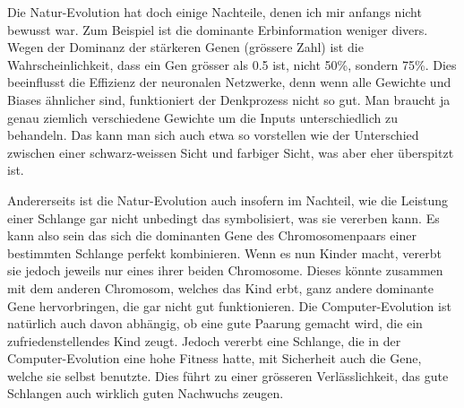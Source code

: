 \documentclass[11pt,a4paper,ngerman]{article}
\begin{document}
\bigskip
Die Natur-Evolution hat doch einige Nachteile, denen ich mir anfangs nicht bewusst war. Zum Beispiel ist die dominante Erbinformation weniger divers. Wegen der Dominanz der stärkeren Genen (grössere Zahl) ist die Wahrscheinlichkeit, dass ein Gen grösser als 0.5 ist, nicht 50\%, sondern 75\%. Dies beeinflusst die Effizienz der neuronalen Netzwerke, denn wenn alle Gewichte und Biases ähnlicher sind, funktioniert der Denkprozess nicht so gut. Man braucht ja genau ziemlich verschiedene Gewichte um die Inputs unterschiedlich zu behandeln. Das kann man sich auch etwa so vorstellen wie der Unterschied zwischen einer schwarz-weissen Sicht und farbiger Sicht, was aber eher überspitzt ist.

\bigskip
Andererseits ist die Natur-Evolution auch insofern im Nachteil, wie die Leistung einer Schlange gar nicht unbedingt das symbolisiert, was sie vererben kann. Es kann also sein das sich die dominanten Gene des Chromosomenpaars einer bestimmten Schlange perfekt kombinieren. Wenn es nun Kinder macht, vererbt sie jedoch jeweils nur eines ihrer beiden Chromosome. Dieses könnte zusammen mit dem anderen Chromosom, welches das Kind erbt, ganz andere dominante Gene hervorbringen, die gar nicht gut funktionieren. Die Computer-Evolution ist natürlich auch davon abhängig, ob eine gute Paarung gemacht wird, die ein zufriedenstellendes Kind zeugt. Jedoch vererbt eine Schlange, die in der Computer-Evolution eine hohe Fitness hatte, mit Sicherheit auch die Gene, welche sie selbst benutzte. Dies führt zu einer grösseren Verlässlichkeit, das gute Schlangen auch wirklich guten Nachwuchs zeugen.
\end{document}
